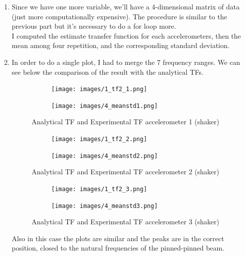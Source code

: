 \documentclass[11pt,a4paper]{article}
\begin{document}
\begin{enumerate}
	\item Since we have one more variable, we'll have a 4-dimensional matrix of data (just  more computationally expensive). The procedure is similar to the previous part but it's necessary to do a for loop more. \\
	I computed the estimate transfer function for each accelerometers, then the mean among four repetition, and the corresponding standard deviation.
	
	\medskip
	
	\item In order to do a single plot, I had to merge the 7 frequency ranges. We can see below the comparison of the result with the analytical TFs.

	\begin{figure}[H]
		\begin{subfigure}[b]{0.5\textwidth}
			\centering
			\texttt{[image: images/1\_tf2\_1.png]}
		\end{subfigure}
		\hfill
		\begin{subfigure}[b]{0.5\textwidth}
			\centering
			\texttt{[image: images/4\_meanstd1.png]}
		\end{subfigure}
		\caption{Analytical TF and Experimental TF accelerometer 1 (shaker)}
	\end{figure}
	
	\begin{figure}[H]
		\begin{subfigure}[b]{0.5\textwidth}
			\centering
			\texttt{[image: images/1\_tf2\_2.png]}
		\end{subfigure}
		\hfill
		\begin{subfigure}[b]{0.5\textwidth}
			\centering
			\texttt{[image: images/4\_meanstd2.png]}
		\end{subfigure}
		\caption{Analytical TF and Experimental TF accelerometer 2 (shaker)}
	\end{figure}
	
	\begin{figure}[H]
		\begin{subfigure}[b]{0.5\textwidth}
			\centering
			\texttt{[image: images/1\_tf2\_3.png]}
		\end{subfigure}
		\hfill
		\begin{subfigure}[b]{0.5\textwidth}
			\centering
			\texttt{[image: images/4\_meanstd3.png]}
		\end{subfigure}
		\caption{Analytical TF and Experimental TF accelerometer 3 (shaker)}
	\end{figure}
	Also in this case the plots are similar and the peaks are in the correct position, closed to the natural frequencies of the pinned-pinned beam.
\end{enumerate}	

\footnotesize
\newpage
\hypersetup{linkcolor = black}
\listoffigures
\listoftables
\end{document}
